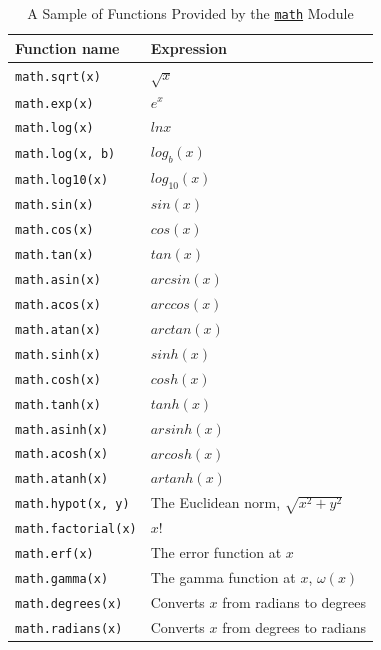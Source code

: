 \documentclass[a4paper,11pt]{book}
\begin{document}
\begin{table}[!htbp]
	\centering
	\caption{A Sample of Functions Provided by the \href{https://docs.python.org/3/library/math.html}{\texttt{math}} Module}
	\label{tab:math_module_functions}
	\begin{tabular}{ll}
		\toprule \toprule
		Function name &  Expression \\
		\midrule
		\texttt{math.sqrt(x)} & $\sqrt{x}$ \\
		\texttt{math.exp(x)} & $e^{x}$ \\
		\texttt{math.log(x)} & $ln{x}$ \\
		\texttt{math.log(x, b)} & $log_{b}(x)$ \\
		\texttt{math.log10(x)} & $log_{10}(x)$ \\
		\texttt{math.sin(x)} & $sin(x)$ \\
		\texttt{math.cos(x)} & $cos(x)$ \\
		\texttt{math.tan(x)} & $tan(x)$ \\
		\texttt{math.asin(x)} & $arcsin(x)$ \\
		\texttt{math.acos(x)} & $arccos(x)$ \\
		\texttt{math.atan(x)} & $arctan(x)$ \\
		\texttt{math.sinh(x)} & $sinh(x)$ \\
		\texttt{math.cosh(x)} & $cosh(x)$ \\
		\texttt{math.tanh(x)} & $tanh(x)$ \\
		\texttt{math.asinh(x)} & $arsinh(x)$ \\
		\texttt{math.acosh(x)} & $arcosh(x)$ \\
		\texttt{math.atanh(x)} & $artanh(x)$ \\
		\texttt{math.hypot(x, y)} & The Euclidean norm, $\sqrt{x^{2} + y^{2}}$ \\
		\texttt{math.factorial(x)} & $x!$ \\
		\texttt{math.erf(x)} & The error function at $x$ \\
		\texttt{math.gamma(x)} & The gamma function at $x$, $\omega(x)$ \\
		\texttt{math.degrees(x)} & Converts $x$ from radians to degrees \\
		\texttt{math.radians(x)} & Converts $x$ from degrees to radians\\
		\bottomrule 
	\end{tabular}
\end{table}
\clearpage
\end{document}
